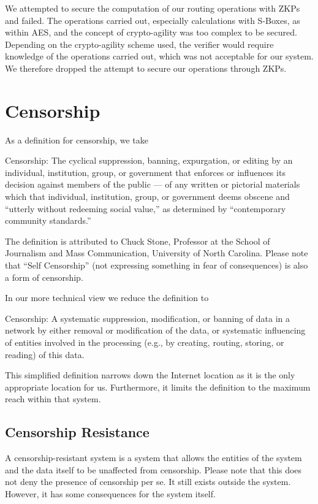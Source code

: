 We attempted to secure the computation of our routing operations with ZKPs and failed. The operations carried out, especially calculations with S-Boxes, as within AES, and the concept of crypto-agility was too complex to be secured. Depending on the crypto-agility scheme used, the verifier would require knowledge of the operations carried out, which was not acceptable for our system. We therefore dropped the attempt to secure our operations through ZKPs.

\section{Censorship}
As a definition for censorship, we take
\begin{shadequote}{}
	Censorship: The cyclical suppression, banning, expurgation, or editing by an individual, institution, group, or government that enforces or influences its decision against members of the public --- of any written or pictorial materials which that individual, institution, group, or government deems obscene and ``utterly without redeeming social value,'' as determined by ``contemporary community standards.''
\end{shadequote}

The definition is attributed to Chuck Stone, Professor at the School of Journalism and Mass Communication, University of North Carolina. Please note that ``Self Censorship'' (not expressing something in fear of consequences) is also a form of censorship.

In our more technical view we reduce the definition to
\begin{shadequote}{}
	Censorship: A systematic suppression, modification, or banning of data in a network by either removal or modification of the data, or systematic influencing of entities involved in the processing (e.g., by creating, routing, storing, or reading) of this data.
\end{shadequote}
This simplified definition narrows down the Internet location as it is the only appropriate location for us. Furthermore, it limits the definition to the maximum reach within that system.

\subsection{Censorship Resistance}
A censorship-resistant system is a system that allows the entities of the system and the data itself to be unaffected from censorship. Please note that this does not deny the presence of censorship per se. It still exists outside the system. However, it has some consequences for the system itself.

